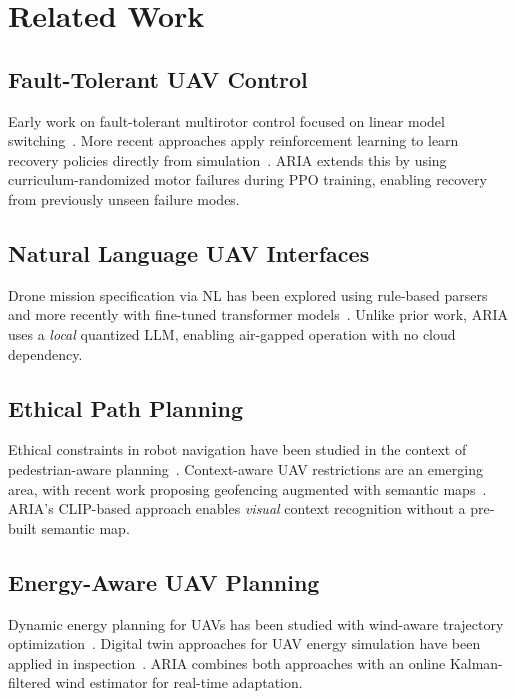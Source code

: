 \documentclass[10pt,twocolumn]{article}
\begin{document}
\section{Related Work}
\label{sec:related}

\subsection{Fault-Tolerant UAV Control}
Early work on fault-tolerant multirotor control focused on linear
model switching~\cite{mueller2014stability}. More recent approaches
apply reinforcement learning to learn recovery policies directly
from simulation~\cite{hwangbo2017control}. ARIA extends this by
using curriculum-randomized motor failures during PPO training,
enabling recovery from previously unseen failure modes.

\subsection{Natural Language UAV Interfaces}
Drone mission specification via NL has been explored using
rule-based parsers~\cite{jiang2015natural} and more recently with
fine-tuned transformer models~\cite{han2023robot}. Unlike prior
work, ARIA uses a \textit{local} quantized LLM, enabling
air-gapped operation with no cloud dependency.

\subsection{Ethical Path Planning}
Ethical constraints in robot navigation have been studied in the
context of pedestrian-aware planning~\cite{fraichard2004inevitable}.
Context-aware UAV restrictions are an emerging area, with recent
work proposing geofencing augmented with semantic
maps~\cite{shaw2020ethical}. ARIA's CLIP-based approach enables
\textit{visual} context recognition without a pre-built semantic map.

\subsection{Energy-Aware UAV Planning}
Dynamic energy planning for UAVs has been studied with wind-aware
trajectory optimization~\cite{yao2020wind}. Digital twin approaches
for UAV energy simulation have been applied in
inspection~\cite{lu2020digital}. ARIA combines both approaches
with an online Kalman-filtered wind estimator for real-time
adaptation.
\end{document}
